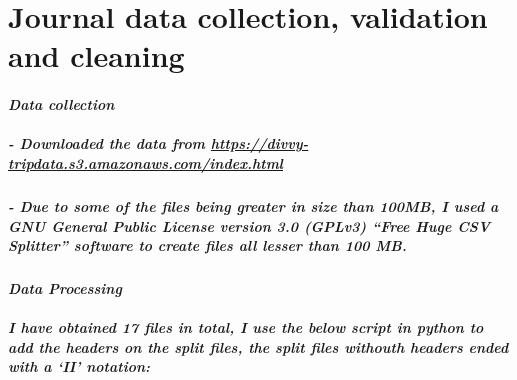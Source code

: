 \documentclass[
]{article}
\author{}
\date{\vspace{-2.5em}}
\begin{document}
\hypertarget{journal-data-collection-validation-and-cleaning}{%
\section{Journal data collection, validation and
cleaning}\label{journal-data-collection-validation-and-cleaning}}

\hypertarget{data-collection}{%
\paragraph{\texorpdfstring{\emph{Data
collection}}{Data collection}}\label{data-collection}}

\hypertarget{downloaded-the-data-from-httpsdivvy-tripdata.s3.amazonaws.comindex.html}{%
\subparagraph{\texorpdfstring{- Downloaded the data from
\url{https://divvy-tripdata.s3.amazonaws.com/index.html}}{- Downloaded the data from https://divvy-tripdata.s3.amazonaws.com/index.html}}\label{downloaded-the-data-from-httpsdivvy-tripdata.s3.amazonaws.comindex.html}}

\hypertarget{due-to-some-of-the-files-being-greater-in-size-than-100mb-i-used-a-gnu-general-public-license-version-3.0-gplv3-free-huge-csv-splitter-software-to-create-files-all-lesser-than-100-mb.}{%
\subparagraph{\texorpdfstring{- Due to some of the files being greater
in size than 100MB, I used a GNU General Public License version 3.0
(GPLv3) ``Free Huge CSV Splitter'' software to create files all lesser
than 100 MB.
}{- Due to some of the files being greater in size than 100MB, I used a GNU General Public License version 3.0 (GPLv3) ``Free Huge CSV Splitter'' software to create files all lesser than 100 MB.  }}\label{due-to-some-of-the-files-being-greater-in-size-than-100mb-i-used-a-gnu-general-public-license-version-3.0-gplv3-free-huge-csv-splitter-software-to-create-files-all-lesser-than-100-mb.}}

\hypertarget{data-processing}{%
\paragraph{\texorpdfstring{\emph{Data
Processing}}{Data Processing}}\label{data-processing}}

\hypertarget{i-have-obtained-17-files-in-total-i-use-the-below-script-in-python-to-add-the-headers-on-the-split-files-the-split-files-withouth-headers-ended-with-a-ii-notation}{%
\subparagraph{I have obtained 17 files in total, I use the below script
in python to add the headers on the split files, the split files
withouth headers ended with a `II'
notation:}\label{i-have-obtained-17-files-in-total-i-use-the-below-script-in-python-to-add-the-headers-on-the-split-files-the-split-files-withouth-headers-ended-with-a-ii-notation}}
\end{document}
